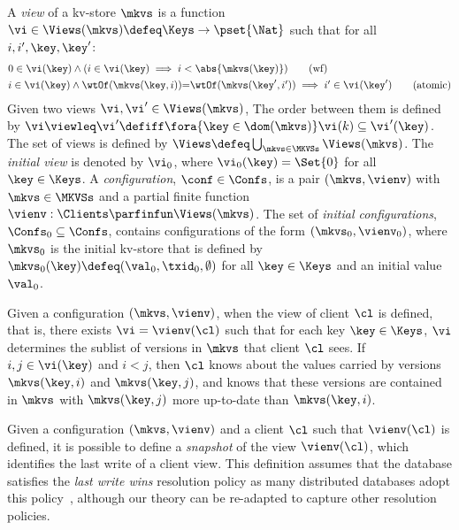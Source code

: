 \begin{definition}
\label{def:view}
\label{def:cuts}
\label{def:views}
\label{def:configuration}
A \emph{view} of a kv-store $\mkvs$ is a function
$\vi \in \Views(\mkvs) \defeq \Keys \to\pset{\Nat}$ such that for all $i, i', \key, \key'$:
%
{
\begin{align}
    & 
    0 \in \vi(\key) 
    \land (i \in \vi(\key) \implies i < \abs{ \mkvs(\key) }) 
    \tag{wf}
    \label{eq:view.wf}\\
    & 
    \begin{array}{@{}l@{}}
	i \in \vi(\key)  
  	\land \wtOf(\mkvs(\key, i)) {=} \wtOf(\mkvs(\key', i'))  
  	\implies i' \in \vi(\key')
    \end{array}
	\tag{atomic}
	\label{eq:view.atomic}
\end{align}
}
Given two views $\vi, \vi' \in \Views(\mkvs)$, 
The order between them is defined by $\vi \viewleq \vi' \defiff \fora{\key \in \dom(\mkvs)} \vi(k) \subseteq \vi'(\key)$.
The set of views is defined by $\Views \defeq \bigcup_{\mkvs \in \MKVSs} \Views(\mkvs)$.
%
\noindent The \emph{initial view} is denoted by $\vi_{0}$, where $\vi_{0}(\key) = \Set{0}$ for all $\key \in \Keys$. 
A \emph{configuration}, $\conf \in \Confs$,  is a pair $ (\mkvs, \vienv)$
with $\mkvs \in \MKVSs$ and a partial finite function
$\vienv : \Clients \parfinfun \Views(\mkvs)$. 
The set of \emph{initial configurations}, $\Confs_0 \subseteq \Confs$, contains configurations of the form $ (\mkvs_0, \vienv_0)$, where $\mkvs_0$ is the initial kv-store
that is defined by
$\mkvs_{0}(\key)\defeq  (\val_0, \txid_0, \emptyset)$ for
all $\key \in \Keys$ and an initial value \( \val_0 \).
\end{definition}
%
%
Given a configuration $(\mkvs, \vienv)$, when the view of client 
$\cl$ is defined, that is, there exists $\vi = \vienv(\cl)$ such that for each key $\key \in \Keys$, 
$\vi$ determines the sublist of versions in $\mkvs$ that client $\cl$ sees. 
If $i,j \in \vi(\key)$ and $i < j$, then $\cl$ knows about the values 
carried by versions $\mkvs(\key, i)$ and  $\mkvs(\key, j)$, 
and  knows that these versions are contained in $\mkvs$ with  $\mkvs(\key, j)$ more 
up-to-date than $\mkvs(\key, i)$. 

Given a configuration $(\mkvs, \vienv)$ and a client $\cl$ such that $\vienv(\cl)$ is
defined, it is possible to define a \emph{snapshot} of the
view $\vienv  (\cl)$, which identifies the last write of a client
view. This definition assumes that the database satisfies the \emph{last write wins}
resolution policy as many distributed databases adopt this policy~\cite{ramp,rola,cops,wren,redblue,PSI,NMSI,gdur,clocksi,distrsi}, although our theory can be 
re-adapted to capture other resolution policies. 


